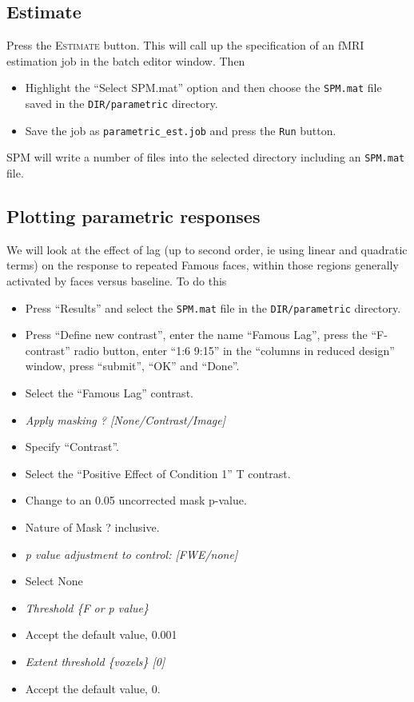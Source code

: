\subsection{Estimate}

Press the \textsc{Estimate} button. This will call up the specification of an fMRI estimation job in the batch editor window. Then
\begin{itemize}
\item Highlight the ``Select SPM.mat'' option and then choose the \texttt{SPM.mat} file saved in the \texttt{DIR/parametric} directory.
\item Save the job as \texttt{parametric\_est.job} and press the \texttt{Run} button.
\end{itemize}
SPM will write a number of files into the selected directory including an \texttt{SPM.mat} file.

\subsection{Plotting parametric responses}

We will look at the effect of lag (up to second order, ie using linear and quadratic terms) on the response to repeated Famous faces, within those regions generally activated by faces versus baseline. To do this
\begin{itemize}
\item Press ``Results'' and select the \texttt{SPM.mat} file in the \texttt{DIR/parametric} directory.
\item Press ``Define new contrast'', enter the name ``Famous Lag'', press the ``F-contrast'' radio button, enter ``1:6 9:15'' in the ``columns in reduced design'' window, press ``submit'', ``OK'' and ``Done''.
\item Select the ``Famous Lag'' contrast.
\item \emph{Apply masking ? [None/Contrast/Image]}
\item Specify ``Contrast''.
\item Select the ``Positive Effect of Condition 1'' T contrast.
\item Change to an 0.05 uncorrected mask p-value.
\item Nature of Mask ? inclusive.
\item \emph{p value adjustment to control: [FWE/none]}
\item Select None
\item \emph{Threshold \{F or p value\}}
\item Accept the default value, 0.001
\item \emph{Extent threshold \{voxels\} [0]}
\item Accept the default value, 0.
\end{itemize}


